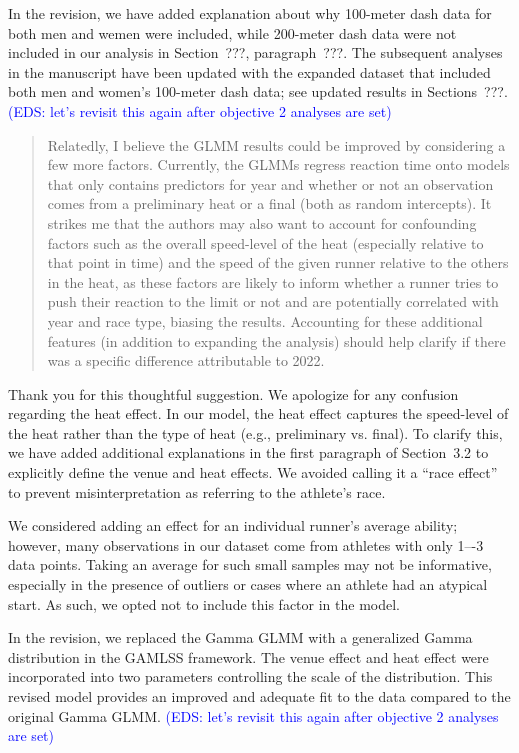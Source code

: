 \documentclass[12pt]{article}
\newcommand{\eds}[1]{\textcolor{blue}{(EDS: #1)}}
\newenvironment{comment}%
{\begin{quotation}\noindent\small\it\color{darkblue}\ignorespaces%
}{\end{quotation}}
\begin{document}
In the revision, we have added explanation about why 100-meter dash
data for both men and wemen were included, while 200-meter dash data
were not included in our analysis in Section~???, paragraph~???.
The subsequent analyses in the manuscript have been updated with the
expanded dataset that included both men and women's 100-meter dash
data; see updated results in Sections~???.
\eds{let's revisit this again after objective 2 analyses are set}


\begin{comment}
Relatedly, I believe the GLMM results could be improved by considering a few
more factors. Currently, the GLMMs regress reaction time onto models that only
contains predictors for year and whether or not an observation comes from a
preliminary heat or a final (both as random intercepts). It strikes me that the
authors may also want to account for confounding factors such as the overall
speed-level of the heat (especially relative to that point in time) and the
speed of the given runner relative to the others in the heat, as these factors
are likely to inform whether a runner tries to push their reaction to the limit
or not and are potentially correlated with year and race type, biasing the
results. Accounting for these additional features (in addition to expanding the
analysis) should help clarify if there was a specific difference attributable to
2022.
\end{comment} 


Thank you for this thoughtful suggestion. We apologize for any
confusion regarding the heat effect. In our model, the heat effect
captures the speed-level of the heat rather than the type of heat
(e.g., preliminary vs. final). To clarify this, we have added
additional explanations in the first paragraph of Section~3.2 to
explicitly define the venue and heat effects. We avoided calling it a
``race effect'' to prevent misinterpretation as referring to the
athlete's race.


We considered adding an effect for an individual runner’s average
ability; however, many observations in our dataset come from athletes
with only 1–-3 data points. Taking an average for such small samples
may not be informative, especially in the presence of outliers or
cases where an athlete had an atypical start. As such, we opted not to
include this factor in the model.


In the revision, we replaced the Gamma GLMM with a generalized Gamma
distribution in the GAMLSS framework. The venue effect and heat effect
were incorporated into two parameters controlling the scale of the
distribution. This revised model provides an improved and adequate fit
to the data compared to the original Gamma GLMM.
\eds{let's revisit this again after objective 2 analyses are set}
\end{document}
